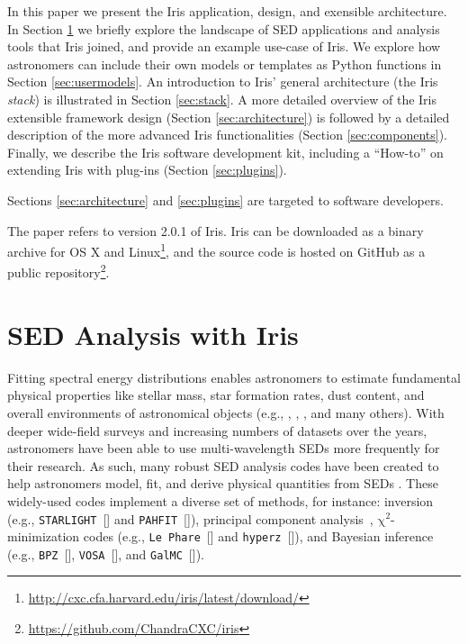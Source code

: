 \documentclass[final,5p,authoryear]{elsarticle}
\begin{document}
In this paper we present the Iris application, design, and exensible architecture. In Section
\ref{sec:overview} we briefly explore the landscape of SED applications and
analysis tools that Iris joined, and provide an example use-case of Iris. We
explore how astronomers can include their own models or templates as Python
functions in Section \ref{sec:usermodels}. An introduction to Iris' general
architecture (the Iris \emph{stack}) is illustrated in Section \ref{sec:stack}.
A more detailed overview of the Iris extensible framework design (Section
\ref{sec:architecture}) is followed by a detailed description of the more
advanced Iris functionalities (Section \ref{sec:components}). Finally, we
describe the Iris software development kit, including a ``How-to'' on extending
Iris with plug-ins (Section \ref{sec:plugins}).

Sections \ref{sec:architecture} and \ref{sec:plugins} are targeted to software
developers.

The paper refers to version 2.0.1 of Iris. Iris can be downloaded as a binary
archive for OS X and
Linux\footnote{\url{http://cxc.cfa.harvard.edu/iris/latest/download/}}, and the
source code is hosted on GitHub as a public
repository\footnote{\url{https://github.com/ChandraCXC/iris}}.

\section{SED Analysis with Iris} \label{sec:overview}

Fitting spectral energy distributions enables astron\-omers to estimate fundamental
physical properties like stellar mass, star formation rates, dust content, and
overall environments of astronomical objects (e.g., \citet{1998AJ....115.1329S},
\citet{2001ApJS..137..139S}, \citet{2007ApJS..169..328R}, and many others). With
deeper wide-field surveys and increasing numbers of datasets over the years,
astronomers have been able to use multi-wavelength SEDs more frequently for
their research. As such, many robust SED analysis codes have been created to
help astronomers mod\-el, fit, and derive physical quantities from SEDs
\citep{2011Ap&SS.331....1W,2013ARA&A..51..393C}. These widely-used codes
implement a diverse set of methods, for instance: inversion (e.g., 
\texttt{STARLIGHT}~[\citealp{2004MNRAS.355..273C}] and
\texttt{PAHFIT}~[\citealp{2007ApJ...656..770S}]),
principal component analysis~\citep[e.g.,][]{2009MNRAS.394.1496B},
$\mathrm{\chi}^{2}$-minimization codes (e.g., \texttt{Le Phare}~[\citealp{1999MNRAS.310..540A}] and 
\texttt{hyperz}~[\citealp{2000A&A...363..476B}]), and Bayesian inference 
(e.g., \texttt{BPZ}~[\citealp{2000ApJ...536..571B}], 
\texttt{VOSA}~[\citealp{2008A&A...492..277B}], and 
\texttt{GalMC}~[\citealp{2011ApJ...737...47A}]).
\end{document}
